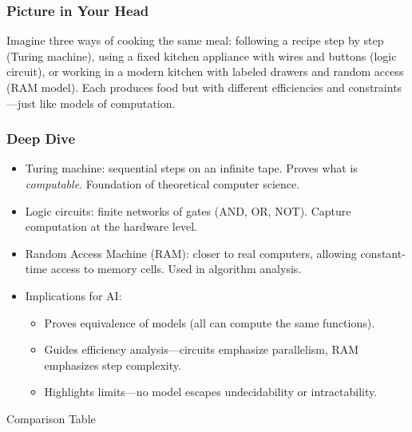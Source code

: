 \documentclass[
  letterpaper,
  DIV=11,
  numbers=noendperiod]{scrreprt}
\providecommand{\tightlist}{%
  \setlength{\itemsep}{0pt}\setlength{\parskip}{0pt}}
\begin{document}
\subsubsection{Picture in Your Head}\label{picture-in-your-head-31}

Imagine three ways of cooking the same meal: following a recipe step by
step (Turing machine), using a fixed kitchen appliance with wires and
buttons (logic circuit), or working in a modern kitchen with labeled
drawers and random access (RAM model). Each produces food but with
different efficiencies and constraints---just like models of
computation.

\subsubsection{Deep Dive}\label{deep-dive-31}

\begin{itemize}
\item
  Turing machine: sequential steps on an infinite tape. Proves what is
  \emph{computable}. Foundation of theoretical computer science.
\item
  Logic circuits: finite networks of gates (AND, OR, NOT). Capture
  computation at the hardware level.
\item
  Random Access Machine (RAM): closer to real computers, allowing
  constant-time access to memory cells. Used in algorithm analysis.
\item
  Implications for AI:

  \begin{itemize}
  \tightlist
  \item
    Proves equivalence of models (all can compute the same functions).
  \item
    Guides efficiency analysis---circuits emphasize parallelism, RAM
    emphasizes step complexity.
  \item
    Highlights limits---no model escapes undecidability or
    intractability.
  \end{itemize}
\end{itemize}

Comparison Table
\end{document}
